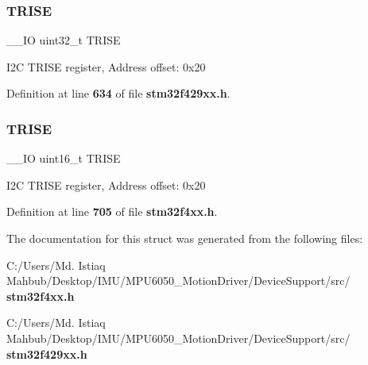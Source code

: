 \subsubsection{T\+R\+I\+SE\hspace{0.1cm}{\footnotesize\ttfamily [1/2]}}
{\footnotesize\ttfamily \+\_\+\+\_\+\+IO uint32\+\_\+t T\+R\+I\+SE}

I2C T\+R\+I\+SE register, Address offset\+: 0x20 

Definition at line \textbf{ 634} of file \textbf{ stm32f429xx.\+h}.

\mbox{\label{structI2C__TypeDef_a7fbb70132ee565bb179078b6ee20cc2b}} 
\subsubsection{T\+R\+I\+SE\hspace{0.1cm}{\footnotesize\ttfamily [2/2]}}
{\footnotesize\ttfamily \+\_\+\+\_\+\+IO uint16\+\_\+t T\+R\+I\+SE}

I2C T\+R\+I\+SE register, Address offset\+: 0x20 

Definition at line \textbf{ 705} of file \textbf{ stm32f4xx.\+h}.



The documentation for this struct was generated from the following files\+:\begin{DoxyCompactItemize}
\item 
C\+:/\+Users/\+Md. Istiaq Mahbub/\+Desktop/\+I\+M\+U/\+M\+P\+U6050\+\_\+\+Motion\+Driver/\+Device\+Support/src/\textbf{ stm32f4xx.\+h}\item 
C\+:/\+Users/\+Md. Istiaq Mahbub/\+Desktop/\+I\+M\+U/\+M\+P\+U6050\+\_\+\+Motion\+Driver/\+Device\+Support/src/\textbf{ stm32f429xx.\+h}\end{DoxyCompactItemize}

